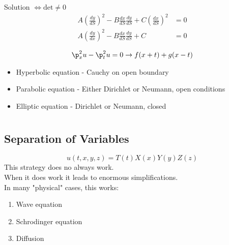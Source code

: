 \documentclass[Maths.tex]{subfiles}
\begin{document}
Solution $\iff \text{det} \neq 0$
\begin{align}
	A\left(\frac{dy}{dS}\right)^2 - B\frac{dx}{dS}\frac{dy}{dS} + C\left(\frac{dx}{dS}\right)^2 &= 0 \\
	A\left(\frac{dy}{dx}\right)^2 - B\frac{dx}{dS}\frac{dy}{dS} + C &= 0
\end{align}

\begin{example}
\begin{align}
	\p_x^2u - \p_t^2u = 0 \to f(x+t) + g(x-t)
\end{align}
\begin{itemize}
	\item Hyperbolic equation - Cauchy on open boundary
	\item Parabolic equation - Either Dirichlet or Neumann, open conditions
	\item Elliptic equation - Dirichlet or Neumann, closed
\end{itemize}
\end{example}

\chapter{}
\section{Separation of Variables}
\begin{equation}
	u(t,x,y,z) = T(t)X(x)Y(y)Z(z)
\end{equation}
This strategy does no always work. \\
When it does work it leads to enormous simplifications. \\
In many "physical" cases, this works:
\begin{enumerate}
	\item Wave equation
	\item Schrodinger equation
	\item Diffusion
\end{enumerate}
\end{document}
